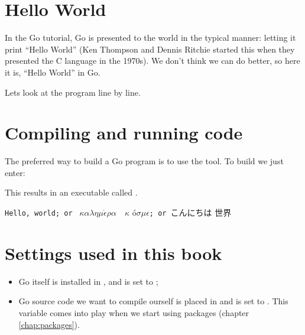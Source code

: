 \section{Hello World}
\label{sec:hello world}
In the Go tutorial, Go is presented to the world in the typical
manner: letting it print ``Hello World'' (Ken Thompson and
Dennis Ritchie started this when they presented the C language in 
the 1970s). We don't think we can do better, so
here it is, ``Hello World'' in Go.


Lets look at the program line by line.
\showremarks

\section{Compiling and running code}
\label{sec:building a program}
The preferred way to build a Go program is to use the  tool.
To build  we just enter:
\begin{display}
\pr {}
\end{display}
This results in an executable called .

\begin{display}
\pr {}
\end{display}
\vspace{-3.0ex}
\texttt{Hello, world; or }%
\begin{math}\kappa\alpha\lambda\eta\mu\acute{\epsilon}\rho\alpha\hspace{1em}\kappa\end{math}%
\'o\begin{math} \sigma\mu\epsilon\end{math}\texttt{; or }こんにちは 世界
\ \newline
\ \newline

\section{Settings used in this book}
\label{sec:settings_used}
\begin{itemize}                            
\item Go itself is installed in , and  is set to  ;     
\item Go source code we want to compile ourself is placed in  and
 is set to  . This variable comes into play
when we start using packages (chapter \ref{chap:packages}).
\end{itemize}

